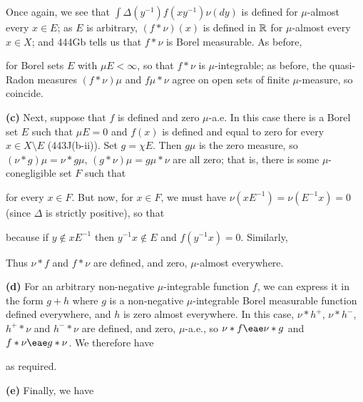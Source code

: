 {\noindent Once again, we see that $\int\Delta(y^{-1})f(xy^{-1})\nu(dy)$ is
defined for $\mu$-almost every $x\in E$;  as $E$ is arbitrary,
$(f*\nu)(x)$ is defined in $\Bbb R$ for $\mu$-almost every $x\in X$;
and 444Gb tells us that $f*\nu$ is Borel measurable.   As before,


\noindent for Borel sets $E$ with $\mu E<\infty$, so that $f*\nu$ is
$\mu$-integrable;  as before, the quasi-Radon measures $(f*\nu)\mu$ and
$f\mu*\nu$ agree on open sets of finite $\mu$-measure, so coincide.

\medskip

{\bf (c)} Next, suppose that $f$ is defined and zero $\mu$-a.e.   In
this case there is a Borel set $E$ such that $\mu E=0$ and $f(x)$ is
defined and equal to zero for every $x\in X\setminus E$ (443J(b-ii)).
Set $g=\chi E$.   Then $g\mu$ is the zero measure, so
$(\nu*g)\mu=\nu*g\mu$, $(g*\nu)\mu=g\mu*\nu$ are all zero;  that is,
there is some $\mu$-conegligible set $F$ such that



\noindent for every $x\in F$.   But now, for $x\in F$, we must have
$\nu(xE^{-1})=\nu(E^{-1}x)=0$ (since $\Delta$ is strictly positive), so
that


\noindent because if $y\notin xE^{-1}$ then $y^{-1}x\notin E$ and
$f(y^{-1}x)=0$.   Similarly,


\noindent Thus $\nu*f$ and $f*\nu$ are defined, and zero, $\mu$-almost
everywhere.

\medskip

{\bf (d)} For an arbitrary non-negative $\mu$-integrable function $f$,
we can express it in the form $g+h$ where $g$ is a non-negative
$\mu$-integrable Borel measurable function defined everywhere, and $h$
is zero almost everywhere.   In this case, $\nu*h^+$, $\nu*h^-$,
$h^+*\nu$ and $h^-*\nu$ are defined, and zero, $\mu$-a.e., so
$\nu*f\eae\nu*g$ and $f*\nu\eae g*\nu$.   We therefore have


\noindent as required.

\medskip

{\bf (e)} Finally, we have


}%

